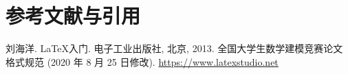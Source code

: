 \section{参考文献与引用}
    \begin{thebibliography}{9}%
        刘海洋.
        \newblock \LaTeX {}入门\allowbreak[J].
        \newblock 电子工业出版社, 北京, 2013.
        全国大学生数学建模竞赛论文格式规范 (2020 年 8 月 25 日修改).
         \url{https://www.latexstudio.net}
    \end{thebibliography}

\newpage
